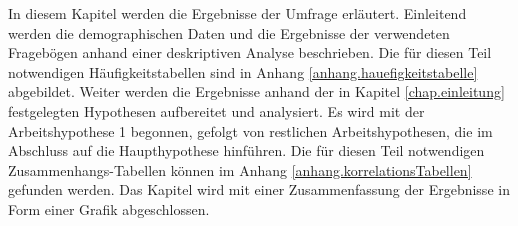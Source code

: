 %
%
\glsresetall
\let\raggedsection\centering
{}
\setcounter{chapter}{3}
\setcounter{section}{0}
\let\raggedsection\raggedright 
In diesem Kapitel werden die Ergebnisse der Umfrage erläutert. Einleitend werden die demographischen Daten und die Ergebnisse der verwendeten Fragebögen anhand einer deskriptiven Analyse beschrieben. Die für diesen Teil notwendigen Häufigkeitstabellen sind in Anhang \ref{anhang.hauefigkeitstabelle} abgebildet. Weiter werden die Ergebnisse anhand der in Kapitel \ref{chap.einleitung} festgelegten Hypothesen aufbereitet und analysiert. Es wird mit der Arbeitshypothese 1 begonnen, gefolgt von restlichen Arbeitshypothesen, die im Abschluss auf die Haupthypothese hinführen. Die für diesen Teil notwendigen Zusammenhangs-Tabellen können im Anhang \ref{anhang.korrelationsTabellen} gefunden werden. Das Kapitel wird mit einer Zusammenfassung der Ergebnisse in Form einer Grafik abgeschlossen.

